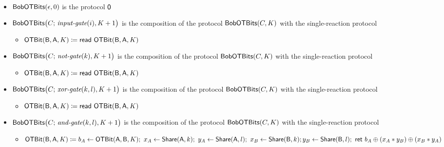 \begin{itemize}
\item $\mathsf{BobOTBits}(\epsilon,0)$ is the protocol $\mathsf{0}$
\item $\mathsf{BobOTBits}\big(C; \, \textit{input-gate}(i),K+1\big)$ is the composition of the protocol $\mathsf{BobOTBits}(C,K)$ with the single-reaction protocol
\begin{itemize}
\item $\mathsf{OTBit}(\mathsf{B},\mathsf{A},K) \coloneqq \mathsf{read} \ \mathsf{OTBit}(\mathsf{B},\mathsf{A},K)$
\end{itemize}
\item $\mathsf{BobOTBits}\big(C; \, \textit{not-gate}(k),K+1\big)$ is the composition of the protocol $\mathsf{BobOTBits}(C,K)$ with the single-reaction protocol
\begin{itemize}
\item $\mathsf{OTBit}(\mathsf{B},\mathsf{A},K) \coloneqq \mathsf{read} \ \mathsf{OTBit}(\mathsf{B},\mathsf{A},K)$
\end{itemize}
\item $\mathsf{BobOTBits}\big(C; \, \textit{xor-gate}(k,l),K+1\big)$ is the composition of the protocol $\mathsf{BobOTBits}(C,K)$ with the single-reaction protocol
\begin{itemize}
\item $\mathsf{OTBit}(\mathsf{B},\mathsf{A},K) \coloneqq \mathsf{read} \ \mathsf{OTBit}(\mathsf{B},\mathsf{A},K)$
\end{itemize}
\item $\mathsf{BobOTBits}\big(C; \, \textit{and-gate}(k,l),K+1\big)$ is the composition of the protocol $\mathsf{BobOTBits}(C,K)$ with the single-reaction protocol
\begin{itemize}
\item $\mathsf{OTBit}(\mathsf{B},\mathsf{A},K) \coloneqq b_A \leftarrow \mathsf{OTBit}(\mathsf{A},\mathsf{B},K); \ x_A \leftarrow \mathsf{Share}(\mathsf{A},k); \ y_A \leftarrow \mathsf{Share}(\mathsf{A},l); \ x_B \leftarrow \mathsf{Share}(\mathsf{B},k); \\ y_B \leftarrow \mathsf{Share}(\mathsf{B},l); \ \mathsf{ret} \ b_A \oplus (x_A * y_B) \oplus (x_B * y_A)$
\end{itemize}
\end{itemize}

